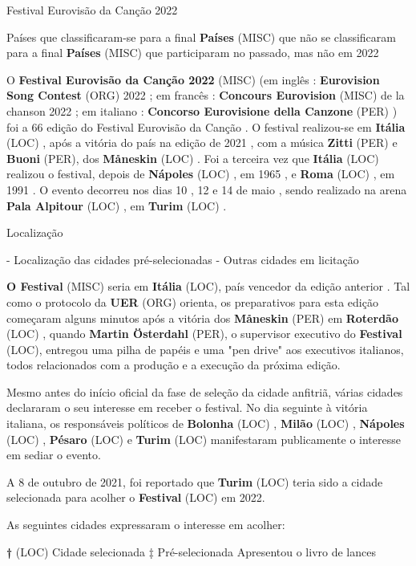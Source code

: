 \documentclass[12pt,a4paper]{article}
\begin{document}
Festival Eurovisão da Canção 2022



Países que classificaram-se para a final \textbf{Países} (MISC) que não se classificaram para a final \textbf{Países} (MISC) que participaram no passado, mas não em 2022

O \textbf{Festival Eurovisão da Canção 2022} (MISC) (em inglês : \textbf{Eurovision Song Contest} (ORG) 2022 ; em francês : \textbf{Concours Eurovision} (MISC) de la chanson 2022 ; em italiano : \textbf{Concorso Eurovisione della Canzone} (PER) ) foi a 66 edição do Festival Eurovisão da Canção . O festival realizou-se em \textbf{Itália} (LOC) , após a vitória do país na edição de 2021 , com a música \textbf{Zitti} (PER) e \textbf{Buoni} (PER), dos \textbf{Måneskin} (LOC) . Foi a terceira vez que \textbf{Itália} (LOC) realizou o festival, depois de \textbf{Nápoles} (LOC) , em 1965 , e \textbf{Roma} (LOC) , em 1991 . O evento decorreu nos dias 10 , 12 e 14 de maio , sendo realizado na arena \textbf{Pala Alpitour} (LOC) , em \textbf{Turim} (LOC) .



Localização

- Localização das cidades pré-selecionadas - Outras cidades em licitação

\textbf{O Festival} (MISC) seria em \textbf{Itália} (LOC), país vencedor da edição anterior . Tal como o protocolo da \textbf{UER} (ORG) orienta, os preparativos para esta edição começaram alguns minutos após a vitória dos \textbf{Måneskin} (PER) em \textbf{Roterdão} (LOC) , quando \textbf{Martin Österdahl} (PER), o supervisor executivo do \textbf{Festival} (LOC), entregou uma pilha de papéis e uma "pen drive" aos executivos italianos, todos relacionados com a produção e a execução da próxima edição.

Mesmo antes do início oficial da fase de seleção da cidade anfitriã, várias cidades declararam o seu interesse em receber o festival. No dia seguinte à vitória italiana, os responsáveis políticos de \textbf{Bolonha} (LOC) , \textbf{Milão} (LOC) , \textbf{Nápoles} (LOC) , \textbf{Pésaro} (LOC) e \textbf{Turim} (LOC) manifestaram publicamente o interesse em sediar o evento.

A 8 de outubro de 2021, foi reportado que \textbf{Turim} (LOC) teria sido a cidade selecionada para acolher o \textbf{Festival} (LOC) em 2022.

As seguintes cidades expressaram o interesse em acolher:

\textbf{†} (LOC) Cidade selecionada ‡ Pré-selecionada Apresentou o livro de lances
\end{document}
